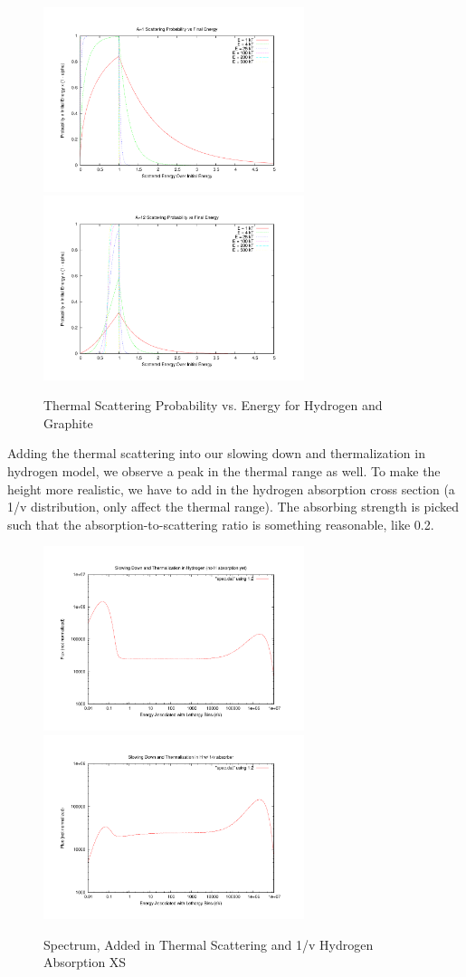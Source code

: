 \documentclass{school-22.211-notes}
\begin{document}
\begin{figure}
  \centering
  \includegraphics[width=3in]{images/sl-d/ts_H.uncrop.pdf}
  \includegraphics[width=3in]{images/sl-d/ts_C.uncrop.pdf}
  \caption{Thermal Scattering Probability vs. Energy for Hydrogen and Graphite} \label{ts-C-H}
\end{figure}

Adding the thermal scattering into our slowing down and thermalization in hydrogen model, we observe a peak in the thermal range as well. To make the height more realistic, we have to add in the hydrogen absorption cross section (a 1/v distribution, only affect the thermal range). The absorbing strength is picked such that the absorption-to-scattering ratio is something reasonable, like 0.2. 
\begin{figure}
  \centering
  \includegraphics[width=3in]{images/sl-d/spec-4.uncrop.pdf}
  \includegraphics[width=3in]{images/sl-d/spec-5.uncrop.pdf}
  \caption{Spectrum, Added in Thermal Scattering and 1/v Hydrogen Absorption XS} \label{spe1}
\end{figure}
\end{document}
